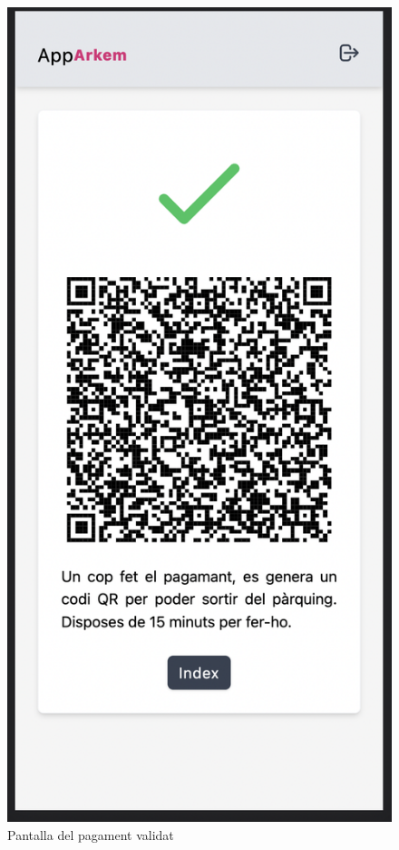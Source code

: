\begin{figure}[H]
    \begin{center}
        \includegraphics[scale=0.50]{Fotos/pantalla7_pagament_success.png}
    \end{center}
    \caption{Pantalla del pagament validat}
    \label{fig:payment_success_photo}
\end{figure}

